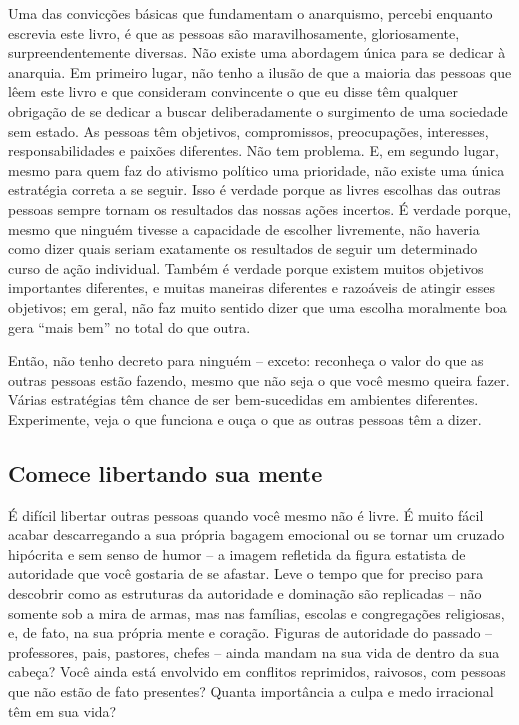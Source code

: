 Uma das convicções básicas que fundamentam o anarquismo, percebi enquanto escrevia este livro, é que as pessoas são maravilhosamente, gloriosamente, surpreendentemente diversas. Não existe uma abordagem única para se dedicar à anarquia. Em primeiro lugar, não tenho a ilusão de que a maioria das pessoas que lêem este livro e que consideram convincente o que eu disse têm qualquer obrigação de se dedicar a buscar deliberadamente o surgimento de uma sociedade sem estado. As pessoas têm objetivos, compromissos, preocupações, interesses, responsabilidades e paixões diferentes. Não tem problema. E, em segundo lugar, mesmo para quem faz do ativismo político uma prioridade, não existe uma única estratégia correta a se seguir. Isso é verdade porque as livres escolhas das outras pessoas sempre tornam os resultados das nossas ações incertos. É verdade porque, mesmo que ninguém tivesse a capacidade de escolher livremente, não haveria como dizer quais seriam exatamente os resultados de seguir um determinado curso de ação individual. Também é verdade porque existem muitos objetivos importantes diferentes, e muitas maneiras diferentes e razoáveis de atingir esses objetivos; em geral, não faz muito sentido dizer que uma escolha moralmente boa gera ``mais bem'' no total do que outra.

Então, não tenho decreto para ninguém -- exceto: reconheça o valor do que as outras pessoas estão fazendo, mesmo que não seja o que você mesmo queira fazer. Várias estratégias têm chance de ser bem-sucedidas em ambientes diferentes. Experimente, veja o que funciona e ouça o que as outras pessoas têm a dizer.

\subsection*{Comece libertando sua mente}

É difícil libertar outras pessoas quando você mesmo não é livre. É muito fácil acabar descarregando a sua própria bagagem emocional ou se tornar um cruzado hipócrita e sem senso de humor -- a imagem refletida da figura estatista de autoridade que você gostaria de se afastar. Leve o tempo que for preciso para descobrir como as estruturas da autoridade e dominação são replicadas -- não somente sob a mira de armas, mas nas famílias, escolas e congregações religiosas, e, de fato, na sua própria mente e coração. Figuras de autoridade do passado -- professores, pais, pastores, chefes -- ainda mandam na sua vida de dentro da sua cabeça? Você ainda está envolvido em conflitos reprimidos, raivosos, com pessoas que não estão de fato presentes? Quanta importância a culpa e medo irracional têm em sua vida?

